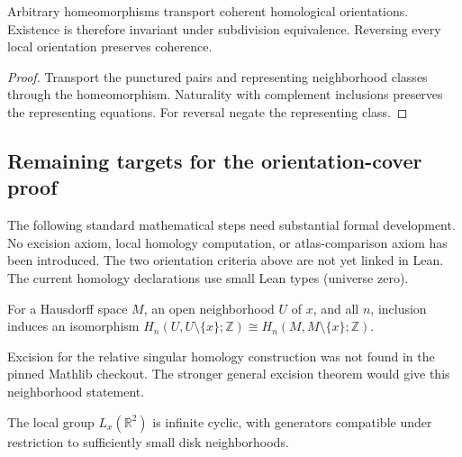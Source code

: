 \begin{lemma}\label{lem:homological-orientation-invariant}

  Arbitrary homeomorphisms transport coherent homological orientations.
  Existence is therefore invariant under subdivision equivalence. Reversing
  every local orientation preserves coherence.
\end{lemma}
\begin{proof}

  Transport the punctured pairs and representing neighborhood classes through
  the homeomorphism. Naturality with complement inclusions preserves the
  representing equations. For reversal negate the representing class.
\end{proof}

\subsection{Remaining targets for the orientation-cover proof}

The following standard mathematical steps need substantial formal development.
No excision axiom, local homology computation, or atlas-comparison axiom has
been introduced. The two orientation criteria above are not yet linked in Lean.
The current homology declarations use small Lean types (universe zero).

\begin{lemma}\label{lem:local-excision}
  \notready
  For a Hausdorff space $M$, an open neighborhood $U$ of $x$, and all $n$,
  inclusion induces an isomorphism
  $H_n(U,U\setminus\{x\};\mathbb Z)\cong H_n(M,M\setminus\{x\};\mathbb Z)$.
\end{lemma}
Excision for the relative singular homology construction was not found in
the pinned Mathlib checkout. The stronger general excision theorem would
give this neighborhood statement.

\begin{lemma}\label{lem:plane-local-homology}
  \notready
  The local group $L_x(\mathbb R^2)$ is infinite cyclic, with generators
  compatible under restriction to sufficiently small disk neighborhoods.
\end{lemma}

